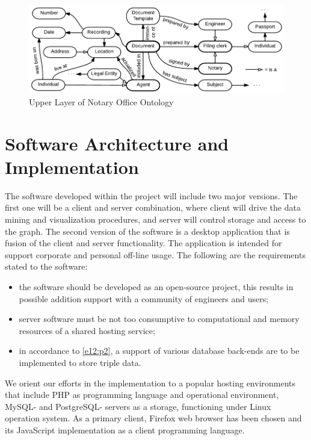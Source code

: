 \documentclass[conference]{IEEEtran}
\begin{document}
\begin{figure}[!t]
\centering
\includegraphics[width=\linewidth]{DocumentOntology-en.pdf}
\caption{Upper Layer of Notary Office Ontology}
\label{notaryontology}
\end{figure}

\section{Software Architecture and Implementation}
\label{sec:arch}

The software developed within the project will include two major
versions.  The first one will be a client and server combination,
where client will drive the data mining and visualization procedures,
and server will control storage and access to the graph.  The second
version of the software is a desktop application that is fusion of the
client and server functionality.  The application is intended for
support corporate and personal off-line usage.  The following are the
requirements stated to the software:
\begin{itemize}
\item the software should be developed as an open-source project,
  this results in possible addition support with a community of
  engineers and users;
\item server software must be not too consumptive to computational and
  memory resources of a shared hosting service; \label{e12:p2}
\item in accordance to \ref{e12:p2}, a support of various database
  back-ends are to be implemented to store triple data.
\end{itemize}

We orient our efforts in the implementation to a popular hosting
environments that include PHP as programming language and operational
environment, MySQL- and PostgreSQL- servers as a storage, functioning
under Linux operation system.  As a primary client, Firefox web browser
has been chosen and its JavaScript implementation as a client
programming language.
\end{document}
